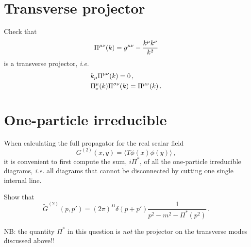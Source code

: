 \documentclass{tutorial}
\begin{document}
\section{Transverse projector}

Check that
\[
  \Pi^{\mu\nu}(k) = g^{\mu\nu} - \frac{k^\mu k^\nu}{k^2}
\]
is a transverse projector, \emph{i.e.}
\begin{align*}
   & k_\mu \Pi^{\mu\nu}(k) =  0 \, ,                             \\
   & \Pi^\mu_\sigma(k) \Pi^{\sigma\nu}(k) = \Pi^{\mu\nu}(k) \, .
\end{align*}



\section{One-particle irreducible}

When calculating the full propagator for the real scalar field
\[
  G^{(2)}(x,y) = \langle T \phi(x) \phi(y) \rangle\, ,
\]
it is convenient to first compute the sum, $i\Pi^*$, of all the
one-particle irreducible diagrams, \emph{i.e.} all diagrams that
cannot be disconnected by cutting one single internal line.

Show that
\[
  \tilde{G}^{(2)}(p,p') = (2\pi)^D \delta(p+p')
  \frac{1}{p^2-m^2-\Pi^*(p^2)}\, .
\]

NB: the quantity $\Pi^*$ in this question is \emph{not} the
projector on the transverse modes discussed above!!
\end{document}
